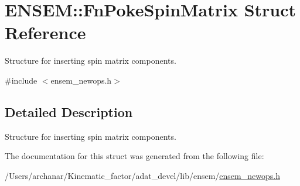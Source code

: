 \hypertarget{structENSEM_1_1FnPokeSpinMatrix}{}\section{E\+N\+S\+EM\+:\+:Fn\+Poke\+Spin\+Matrix Struct Reference}
\label{structENSEM_1_1FnPokeSpinMatrix}


Structure for inserting spin matrix components.  




{\ttfamily \#include $<$ensem\+\_\+newops.\+h$>$}



\subsection{Detailed Description}
Structure for inserting spin matrix components. 

The documentation for this struct was generated from the following file\+:\begin{DoxyCompactItemize}
\item 
/\+Users/archanar/\+Kinematic\+\_\+factor/adat\+\_\+devel/lib/ensem/\mbox{\hyperlink{lib_2ensem_2ensem__newops_8h}{ensem\+\_\+newops.\+h}}\end{DoxyCompactItemize}
